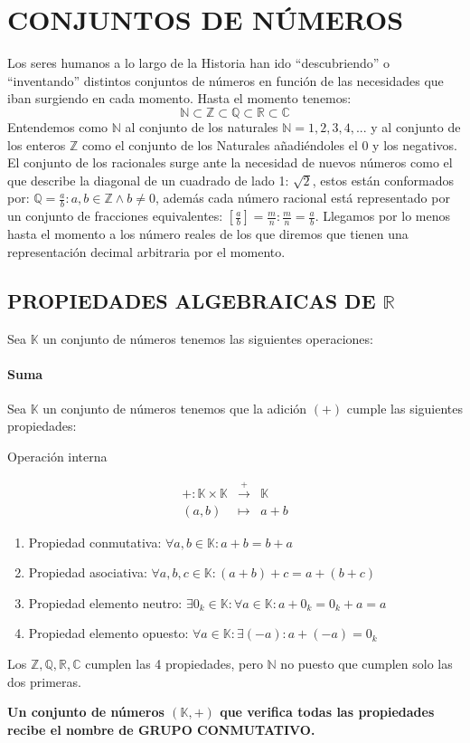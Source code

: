 \documentclass[10pt,a4paper,openright]{book}
\begin{document}
\chapter*{CONJUNTOS DE NÚMEROS}
Los seres humanos a lo largo de la Historia han ido ``descubriendo'' o  ``inventando'' distintos conjuntos de números en función de las necesidades que iban surgiendo en cada momento. Hasta el momento tenemos:
$$\mathbb N\subset \mathbb Z\subset \mathbb Q\subset \mathbb R\subset \mathbb C$$
Entendemos como $\mathbb N$ al conjunto de los naturales $\mathbb N={1,2,3,4,...}$ y al conjunto de los enteros $\mathbb Z$ como el conjunto de los Naturales añadiéndoles el 0 y los negativos. El conjunto de los  racionales surge ante la necesidad de nuevos números como el que describe la diagonal de un cuadrado de lado 1: $\sqrt{2}$, estos están conformados por: $\mathbb Q={\frac{a}{b}: a,b\in \mathbb Z \wedge b\neq 0}$, además cada número racional está representado por un conjunto de fracciones equivalentes: $[\frac{a}{b}]={\frac{m}{n}: \frac{m}{n}=\frac{a}{b}}$. Llegamos por lo menos hasta el momento a los número reales de los que diremos que tienen una representación decimal arbitraria por el momento.

\section*{PROPIEDADES ALGEBRAICAS DE $\mathbb R$}
Sea $\mathbb K$ un conjunto de números tenemos las siguientes operaciones:
\subsubsection*{Suma}
Sea $\mathbb K$ un conjunto de números tenemos que la adición $(+)$ cumple las siguientes propiedades:
\begin{center}
Operación interna
\end{center}
\begin{eqnarray*}
+: \mathbb K \times\mathbb K & \stackrel{+}{\rightarrow} & \mathbb K \\
(a,b) & \longmapsto  & a+b
\end{eqnarray*}

\begin{enumerate}
\item Propiedad conmutativa: $\forall a, b \in \mathbb K: a+b=b+a$
\item Propiedad asociativa: $\forall a, b, c\in \mathbb K : (a+b)+c=a+(b+c)$
\item Propiedad elemento neutro: $\exists 0_k\in \mathbb K : \forall a \in \mathbb K : a+0_k=0_k+a=a$
\item Propiedad elemento opuesto: $\forall a \in \mathbb K : \exists (-a) : a+(-a)=0_k$
\end{enumerate}
Los $\mathbb {Z, Q, R, C}$ cumplen las 4 propiedades, pero $\mathbb N$ no puesto que cumplen solo las dos primeras.\par
\textbf{Un conjunto de números $(\mathbb K, +)$ que verifica todas las propiedades recibe el nombre de GRUPO CONMUTATIVO.}
\end{document}
